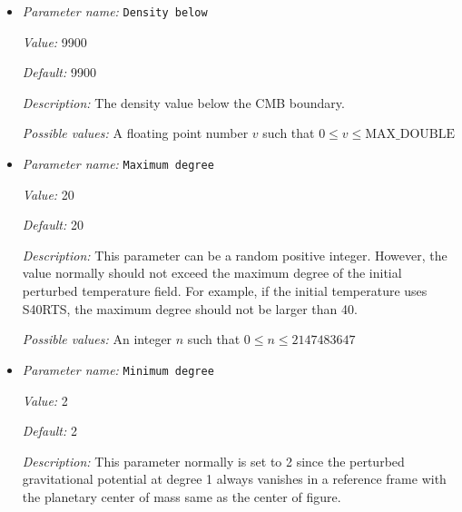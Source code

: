\begin{itemize}
{\it Value:} 0


{\it Default:} 0


{\it Description:} The density value above the surface boundary.


{\it Possible values:} A floating point number $v$ such that $0 \leq v \leq \text{MAX\_DOUBLE}$
\item {\it Parameter name:} {\tt Density below}
\label{parameters:Postprocess/Geoid/Density below}
\label{parameters:Postprocess/Geoid/Density_20below}


{\it Value:} 9900


{\it Default:} 9900


{\it Description:} The density value below the CMB boundary.


{\it Possible values:} A floating point number $v$ such that $0 \leq v \leq \text{MAX\_DOUBLE}$
\item {\it Parameter name:} {\tt Maximum degree}
\label{parameters:Postprocess/Geoid/Maximum degree}
\label{parameters:Postprocess/Geoid/Maximum_20degree}


{\it Value:} 20


{\it Default:} 20


{\it Description:} This parameter can be a random positive integer. However, the value normally should not exceed the maximum degree of the initial perturbed temperature field. For example, if the initial temperature uses S40RTS, the maximum degree should not be larger than 40.


{\it Possible values:} An integer $n$ such that $0\leq n \leq 2147483647$
\item {\it Parameter name:} {\tt Minimum degree}
\label{parameters:Postprocess/Geoid/Minimum degree}
\label{parameters:Postprocess/Geoid/Minimum_20degree}


{\it Value:} 2


{\it Default:} 2


{\it Description:} This parameter normally is set to 2 since the perturbed gravitational potential at degree 1 always vanishes in a reference frame with the planetary center of mass same as the center of figure.



\end{itemize}
